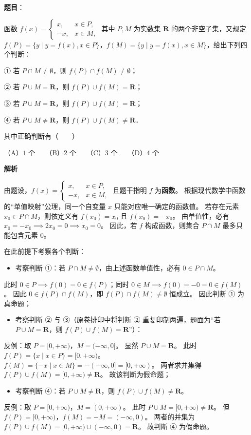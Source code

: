 \begin{answer}

\textbf{题目}：

函数 $f(x)=\begin{cases} x, & x\in P, \\ -x, & x\in M, \end{cases}$ 其中 $P, M$ 为实数集 $\mathbf{R}$ 的两个非空子集，又规定 $f(P)=\{y\mid y=f(x), x\in P\}$，$f(M)=\{y\mid y=f(x), x\in M\}$，给出下列四个判断：

① 若 $P\cap M\neq\emptyset$，则 $f(P)\cap f(M)\neq\emptyset$；

② 若 $P\cup M=\mathbf{R}$，则 $f(P)\cup f(M)=\mathbf{R}$；

③ 若 $P\cup M=\mathbf{R}$，则 $f(P)\cup f(M)=\mathbf{R}$；

④ 若 $P\cup M\neq\mathbf{R}$，则 $f(P)\cup f(M)\neq\mathbf{R}$．

其中正确判断有\mbox{（　　）}

（A）$1$ 个　　（B）$2$ 个　　（C）$3$ 个　　（D）$4$ 个

\textbf{解析}

由题设，$f(x)=\begin{cases} x, & x\in P, \\ -x, & x\in M, \end{cases}$ 且题干指明 $f$ 为\textbf{函数}。
根据现代数学中函数的“单值映射”公理，同一个自变量 $x$ 只能对应唯一确定的函数值。
若存在元素 $x_0\in P\cap M$，则依定义有 $f(x_0)=x_0$ 且 $f(x_0)=-x_0$。
由单值性，必有 $x_0=-x_0\implies 2x_0=0\implies x_0=0$。
因此，若 $f$ 构成函数，则集合 $P\cap M$ 最多只能包含元素 $0$。

在此前提下考察各个判断：
\begin{itemize}
\item 考察判断 ①：若 $P\cap M\neq\emptyset$，由上述函数单值性，必有 $0\in P\cap M$。
\end{itemize}
  此时 $0\in P\implies f(0)=0\in f(P)$；同时 $0\in M\implies f(0)=-0=0\in f(M)$。
  因此 $0\in f(P)\cap f(M)$，即 $f(P)\cap f(M)\neq\emptyset$ 恒成立。
  因此判断 ① 为真命题；
\begin{itemize}
\item 考察判断 ② 与 ③（原卷排印中将判断 ② 重复印制两遍，题面为“若 $P\cup M=\mathbf{R}$，则 $f(P)\cup f(M)=\mathbf{R}$”）：
\end{itemize}
  反例：取 $P=[0, +\infty)$，$M=(-\infty, 0]$。
  显然 $P\cup M=\mathbf{R}$。
  此时 $f(P)=\{x\mid x\in P\}=[0, +\infty)$。
  $f(M)=\{-x\mid x\in M\}=-(-\infty, 0]=[0, +\infty)$。
  两者求并集得 $f(P)\cup f(M)=[0, +\infty)\neq\mathbf{R}$。
  故该判断为假命题；
\begin{itemize}
\item 考察判断 ④：若 $P\cup M\neq\mathbf{R}$，则 $f(P)\cup f(M)\neq\mathbf{R}$。
\end{itemize}
  反例：取 $P=[0, +\infty)$，$M=(0, +\infty)$。
  此时 $P\cup M=[0, +\infty)\neq\mathbf{R}$。
  但 $f(P)=[0, +\infty)$，$f(M)=-M=(-\infty, 0)$。
  两者的并集为 $f(P)\cup f(M)=[0, +\infty)\cup (-\infty, 0)=\mathbf{R}$。
  故判断 ④ 为假命题。


\end{answer}
